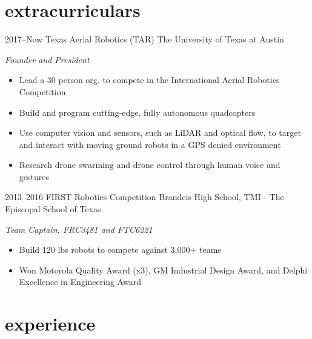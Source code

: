 \documentclass[]{friggeri-cv} %
\begin{document}
\vspace{-11pt}
\section{extracurriculars}
\vspace{-7pt}

\begin{entrylist}

	\entry
	{2017--Now}
	{Texas Aerial Robotics (TAR)}
	{The University of Texas at Austin}
	{
	\emph{Founder and President}
	\begin{itemize}
			\item Lead a 30 person org. to compete in the International Aerial Robotics Competition
			\item Build and program cutting-edge, fully autonomous quadcopters
			\item Use computer vision and sensors, such as LiDAR and optical flow, to target and interact with moving ground robots in a GPS denied environment
			\item Research drone swarming and drone control through human voice and gestures
		\end{itemize}
	}


	\entry
	{2013--2016}
	{FIRST Robotics Competition}
	{Brandeis High School, TMI - The Episcopal School of Texas}
	{
	\emph{Team Captain, FRC3481 and FTC6221}
	\begin{itemize}
			\item Build 120 lbs robots to compete against 3,000+ teams
			\item Won Motorola Quality Award (x3), GM Industrial Design Award, and Delphi Excellence in Engineering Award
		\end{itemize}
	}

\end{entrylist}


\vspace{-11pt}
\section{experience}
\vspace{-7pt}
\end{document}
